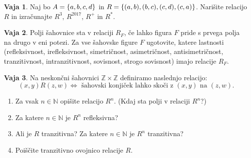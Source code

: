 \documentclass{article}
\newcommand{\ZZ}{\mathbb{Z}}
\theoremstyle{definition}
\newtheorem{vaja}{Vaja}
\begin{document}
\begin{vaja}
Naj bo $A = \set{a,b,c,d}$ in $R = \set{(a,b),(b,c),(c,d),(c,a)}$. Narišite relacijo $R$ in izračunajte $R^3$, $R^{2017}$, $R^+$ in $R^*$.
\end{vaja}


\begin{vaja}
  Polji šahovnice sta v relaciji $R_F$, če lahko figura $F$ pride s prvega polja na drugo
  v eni potezi. Za vse šahovske figure $F$ ugotovite, katere lastnosti (refleksivnost, irefleksivnost, simetričnost, asimetričnost, antisimetričnost, tranzitivnost, intranzitivnost, sovisnost, strogo sovisnost) imajo relacije $R_F$.
\end{vaja}

\begin{vaja}
Na neskončni šahovnici $\ZZ \times \ZZ$ definiramo naslednjo relacijo:
\begin{equation*}
(x,y)R(z,w) \iff \text{ šahovski konjiček lahko skoči z }(x,y)\text{ na }(z,w).
\end{equation*}
\begin{enumerate}
\item Za vsak $n\in\mathbb N$ opišite relacijo $R^n$. (Kdaj sta polji v relaciji $R^n$?)
\item Za katere $n\in\mathbb N$ je $R^n$ refleksivna?
\item Ali je $R$ tranzitivna? Za katere $n\in\mathbb N$ je $R^n$ tranzitivna?
\item Poiščite tranzitivno ovojnico relacije $R$.
\end{enumerate}
\end{vaja}
\end{document}
